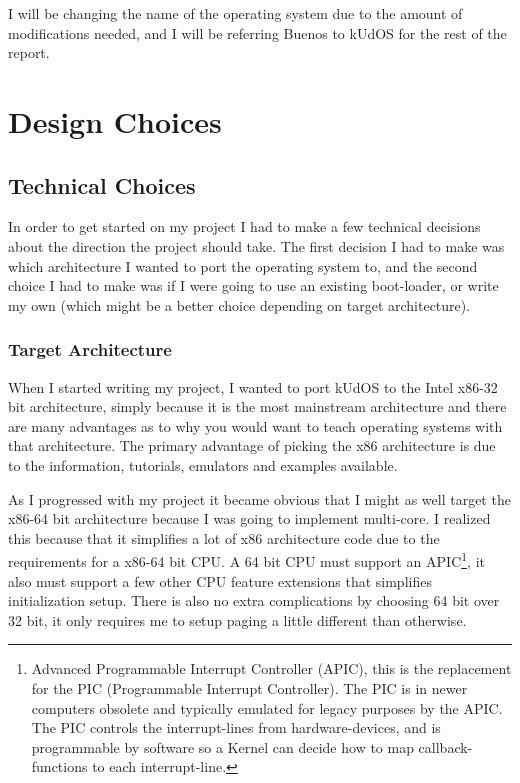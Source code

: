 I will be changing the name of the operating system due to the amount of modifications needed, and I will be referring Buenos to kUdOS for the rest of the report.

\newpage
\chapter{Design Choices}

\section{Technical Choices}

In order to get started on my project I had to make a few technical decisions about the direction the project should take. The first decision I had to make was which architecture I wanted to port the operating system to, and the second choice I had to make was if I were going to use an existing boot-loader, or write my own (which might be a better choice depending on target architecture).

\subsection{Target Architecture}

When I started writing my project, I wanted to port kUdOS to the Intel x86-32 bit architecture, simply because it is the most mainstream architecture and there are many advantages as to why you would want to teach operating systems with that architecture. The primary advantage of picking the x86 architecture is due to the information, tutorials, emulators and examples available. 

As I progressed with my project it became obvious that I might as well target the x86-64 bit architecture because I was going to implement multi-core. I realized this because that it simplifies a lot of x86 architecture code due to the requirements for a x86-64 bit CPU. A 64 bit CPU must support an APIC\footnote{Advanced Programmable Interrupt Controller (APIC), this is the replacement for the PIC (Programmable Interrupt Controller). The PIC is in newer computers obsolete and typically emulated for legacy purposes by the APIC. The PIC controls the interrupt-lines from hardware-devices, and is programmable by software so a Kernel can decide how to map callback-functions to each interrupt-line.}, it also must support a few other CPU feature extensions that simplifies initialization setup. There is also no extra complications by choosing 64 bit over 32 bit, it only requires me to setup paging a little different than otherwise.

